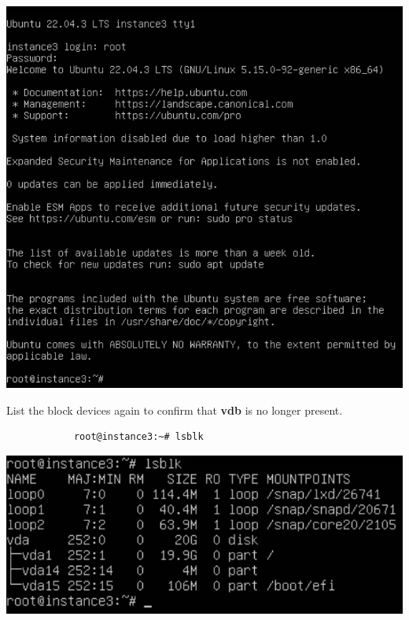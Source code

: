 \documentclass[letterpaper, 12pt]{article}
\begin{document}
\begin{enumerate}
\begin{labstep}
        \begin{center}
            \includegraphics[width=\linewidth]{images/part8/step16.png}
        \end{center}
    \end{labstep}

    \begin{labstep}
        List the block devices again to confirm that \textbf{vdb} is no longer present.
        \begin{lstlisting}
            root@instance3:~# lsblk
        \end{lstlisting}

        \begin{center}
            \includegraphics[width=\linewidth]{images/part8/step17.png}
        \end{center}
    \end{labstep}


\end{enumerate}
\end{document}
